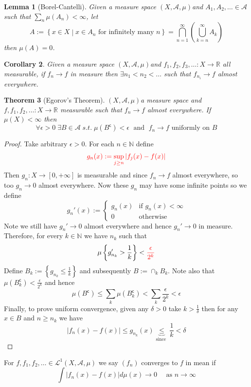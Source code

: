 \documentclass[11pt]{article}
\newcommand{\defeq}{:=}
\newcommand{\abs}[1]{|#1|}
\newcommand{\msrspc}{\ensuremath{(X,\mathcal{A},\mu)}}
\newcommand{\relmiddle}[1]{\mathrel{}\middle#1\mathrel{}}
\newcommand{\rmv}{\relmiddle|}
\newcommand{\stcmp}{^{\mathsf{c}}}
\newcommand{\R}{\mathbb{R}}
\newcommand{\N}{\mathbb{N}}
\newenvironment{defin}
	{\begin{mdframed}[backgroundcolor=white, roundcorner=5pt, linewidth=1pt]}
	{\end{mdframed}}
\newcommand{\mdf}[1]{{\color{red} #1}}
\newcommand{\mem}[1]{{\color{red} #1}}
\newtheorem{theorem}{Theorem}[section]
\newtheorem{cor}[theorem]{Corollary}
\newtheorem{lemma}[theorem]{Lemma}
\begin{document}
\begin{lemma}[Borel-Cantelli]
Given a measure space \msrspc and $A_1, A_2, \dots \in \mathcal{A}$ such that $\sum_{n}\mu(A_n)<\infty$, let
\[
	A\defeq\left\{x \in X \rmv x\in A_n \text{ for infinitely many }n\right\}=\bigcap_{n=1}^\infty\left(\bigcup_{k=n}^\infty A_k\right)
\]
then $\mu(A) = 0$.
\end{lemma}
\begin{cor}
Given a measure space \msrspc and $f_1, f_2, f_3, \dots:X \to \R$ all measurable, if $f_n\to f$ in measure then $\exists n_1 < n_2 < \dots$ such that $f_{n_i}\to f$ almost everywhere.
\end{cor}
\begin{theorem}[Egorov's Theorem]
\msrspc a measure space and $f, f_1, f_2, \dots: X \to \R$ measurable such that $f_n\to f$ almost everywhere.
If $\mu(X)< \infty$ then
\[
	\forall\epsilon > 0 \; \exists B\in\mathcal{A}\;s.t.\;\mu(B\stcmp)<\epsilon\;\text{ and }\;f_n\to f\text{ uniformly on }B
\]
\end{theorem}
\begin{proof}
Take arbitrary $\epsilon >0$.
For each $n\in\N$ define
\[
	\mem{g_n(x)\defeq\sup_{j\geq n}\abs{f_j(x)-f(x)}}
\]
Then $g_n:X\to[0, +\infty]$ is measurable and since $f_n\to f$ almost everywhere, so too $g_n\to 0$ almost everywhere.
Now these $g_n$ may have some infinite points so we define
\[
	g_n'(x)\defeq
	\begin{cases}
		g_n(x) & \text{if }g_n(x) < \infty \\
		0 & \text{otherwise}
	\end{cases}
\]
Note we still have $g_n'\to 0$ almost everywhere and hence $g_n'\to 0$ in measure.
Therefore, for every $k\in \N$ we have $n_k$ such that
\[
	\mu\left\{g_{n_k}'> \frac{1}{k}\right\}< \mem{\frac{\epsilon}{2^k}}
\]
Define \mem{$B_k\defeq\left\{g_{n_k} \leq \frac{1}{k}\right\}$} and subsequently \mem{$B\defeq\cap_k B_k$}.
Note also that $\mu(B_k\stcmp)< \frac{\epsilon}{2^k}$ and hence
\[
	\mu(B\stcmp) \leq \sum_k\mu(B_k\stcmp) < \sum_k\frac{\epsilon}{2^k} < \epsilon
\]
Finally, to prove uniform convergence, given any $\delta >0$ take $k > \frac{1}{\delta}$ then for any $x\in B$ and $n\geq n_k$ we have
\[
	\abs{f_n(x)-f(x)}\leq g_{n_k}(x) \underbrace{\leq }_{\text{since }}\frac{1}{k} < \delta
\]
\end{proof}
\begin{defin}
	For $f, f_1, f_2, \dots\in \mathcal{L}^1(X, \mathcal{A}, \mu)$ we say \mdf{$(f_n)$ converges to $f$ in mean} if
		\[
			\int \abs{f_n(x)- f(x)} d\mu(x) \to 0 \quad \text{ as }n \to\infty
		\]
\end{defin}
\end{document}
